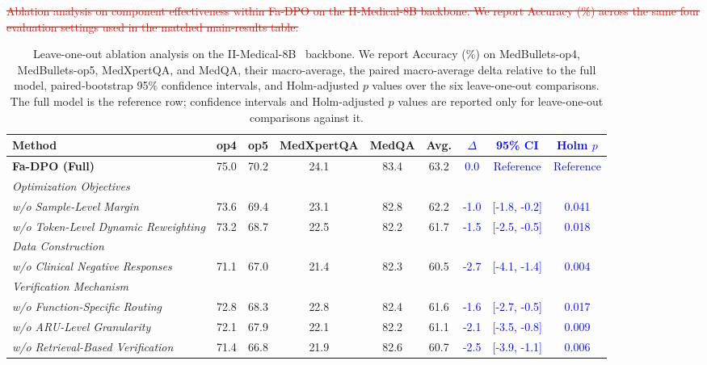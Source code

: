 \documentclass[a4paper,fleqn,doubleblind]{cas-sc}
\DeclareRobustCommand{\deleted}[1]{\textcolor{red}{\sout{#1}}}
\DeclareRobustCommand{\added}[1]{\textcolor{blue}{#1}}
\begin{document}
\begin{table}[htbp]
    \centering
    \renewcommand{\arraystretch}{1.1} 
    \scriptsize
    \setlength{\tabcolsep}{3pt}
\deleted{Ablation analysis on component effectiveness within Fa-DPO on the II-Medical-8B backbone. We report Accuracy (\%) across the same four evaluation settings used in the matched main-results table.}
    \caption[Ablation analysis on component effectiveness within Fa-DPO.]{Leave-one-out ablation analysis on the II-Medical-8B~\cite{intelligentinternet2025iimedical8b} backbone. We report Accuracy (\%) on MedBullets-op4, MedBullets-op5, MedXpertQA, and MedQA, their macro-average, the paired macro-average delta relative to the full model, paired-bootstrap 95\% confidence intervals, and Holm-adjusted $p$ values over the six leave-one-out comparisons. The full model is the reference row; confidence intervals and Holm-adjusted $p$ values are reported only for leave-one-out comparisons against it.}
    \label{tab:ablation}
    \begin{adjustbox}{max width=\textwidth}
        \begin{tabular}{lcccccccc} 
            \toprule
            \textbf{Method} & \textbf{op4} & \textbf{op5} & \textbf{MedXpertQA} & \textbf{MedQA} & \textbf{Avg.} & \added{\textbf{$\Delta$}} & \added{\textbf{95\% CI}} & \added{\textbf{Holm $p$}} \\
            \midrule
            \textbf{Fa-DPO (Full)} & 75.0 & 70.2 & 24.1 & 83.4 & 63.2 & \added{0.0} & \added{Reference} & \added{Reference} \\
            \midrule
            \multicolumn{9}{l}{\textit{Optimization Objectives}} \\
            \quad \textit{w/o Sample-Level Margin} & 73.6 & 69.4 & 23.1 & 82.8 & 62.2 & \added{-1.0} & \added{[-1.8, -0.2]} & \added{0.041} \\
            \quad \textit{w/o Token-Level Dynamic Reweighting} & 73.2 & 68.7 & 22.5 & 82.2 & 61.7 & \added{-1.5} & \added{[-2.5, -0.5]} & \added{0.018} \\
            \midrule
            \multicolumn{9}{l}{\textit{Data Construction}} \\
            \quad \textit{w/o Clinical Negative Responses} & 71.1 & 67.0 & 21.4 & 82.3 & 60.5 & \added{-2.7} & \added{[-4.1, -1.4]} & \added{0.004} \\
            \midrule
            \multicolumn{9}{l}{\textit{Verification Mechanism}} \\
            \quad \textit{w/o Function-Specific Routing} & 72.8 & 68.3 & 22.8 & 82.4 & 61.6 & \added{-1.6} & \added{[-2.7, -0.5]} & \added{0.017} \\
            \quad \textit{w/o ARU-Level Granularity} & 72.1 & 67.9 & 22.1 & 82.2 & 61.1 & \added{-2.1} & \added{[-3.5, -0.8]} & \added{0.009} \\
            \quad \textit{w/o Retrieval-Based Verification} & 71.4 & 66.8 & 21.9 & 82.6 & 60.7 & \added{-2.5} & \added{[-3.9, -1.1]} & \added{0.006} \\
            \bottomrule
        \end{tabular}
    \end{adjustbox}
\end{table}
\end{document}
